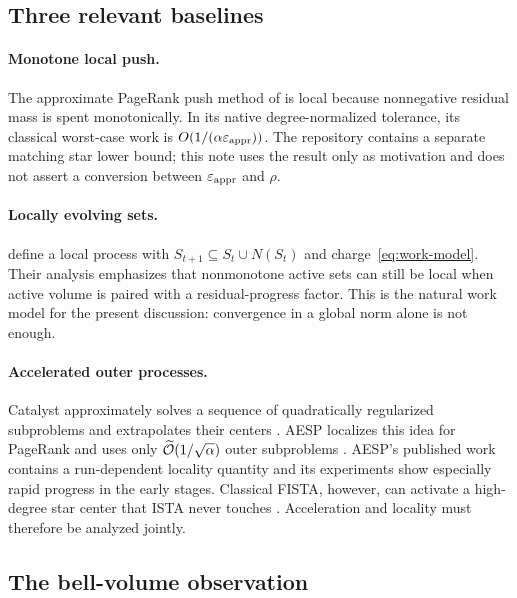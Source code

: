 \subsection{Three relevant baselines}

\paragraph{Monotone local push.}
The approximate PageRank push method of \citet{andersen2007using} is local
because nonnegative residual mass is spent monotonically.  In its native
degree-normalized tolerance, its classical worst-case work is
$O(1/(\alpha\varepsilon_{\mathrm{appr}}))$.  The repository contains a separate
matching star lower bound; this note uses the result only as motivation and
does not assert a conversion between $\varepsilon_{\mathrm{appr}}$ and $\rho$.

\paragraph{Locally evolving sets.}
\citet{zhou2024iterative} define a local process with
$S_{t+1}\subseteq S_t\cup N(S_t)$ and charge~\eqref{eq:work-model}.  Their
analysis emphasizes that nonmonotone active sets can still be local when
active volume is paired with a residual-progress factor.  This is the natural
work model for the present discussion: convergence in a global norm alone is
not enough.

\paragraph{Accelerated outer processes.}
Catalyst approximately solves a sequence of quadratically regularized
subproblems and extrapolates their centers
\citep{lin2018catalyst}.  AESP localizes this idea for PageRank and uses only
$\widetilde{\mathcal{O}}(1/\sqrt\alpha)$ outer subproblems
\citep{huang2025accelerated}.  AESP's published work contains a run-dependent
locality quantity and its experiments show especially rapid progress in the
early stages.  Classical FISTA, however, can activate a high-degree star
center that ISTA never touches \citep{fountoulakis2026complexity}.  Acceleration
and locality must therefore be analyzed jointly.

\subsection{The bell-volume observation}

